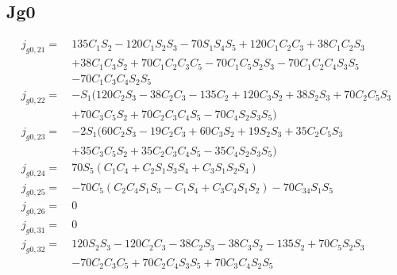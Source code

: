 \subsection{ \textbf{Jg0} }
\begin{equation*}
\begin{split}
j_{g0,21} =\  &135C_1S_2 - 120C_1S_2S_3 - 70S_1S_4S_5 + 120C_1C_2C_3 + 38C_1C_2S_3\\
			  & + 38C_1C_3S_2 + 70C_1C_2C_3C_5 - 70C_1C_5S_2S_3 - 70C_1C_2C_4S_3S_5\\
		 	  & - 70C_1C_3C_4S_2S_5\\
j_{g0,22} =\  &-S_1(120C_2S_3 - 38C_2C_3 - 135C_2 + 120C_3S_2 + 38S_2S_3 + 70C_2C_5S_3\\
		   	  &+ 70C_3C_5S_2 + 70C_2C_3C_4S_5 - 70C_4S_2S_3S_5)\\
j_{g0,23} =\  &-2S_1(60C_2S_3 - 19C_2C_3 + 60C_3S_2 + 19S_2S_3 + 35C_2C_5S_3\\
			  & + 35C_3C_5S_2 + 35C_2C_3C_4S_5 - 35C_4S_2S_3S_5)\\
j_{g0,24} =\  &70S_5(C_1C_4 + C_2S_1S_3S_4 + C_3S_1S_2S_4)\\
j_{g0,25} =\  &- 70C_5(C_2C_4S_1S_3 - C_1S_4 + C_3C_4S_1S_2) - 70C_{34}S_1S_5\\
j_{g0,26} =\  &0\\
j_{g0,31} =\  &0\\
j_{g0,32} =\  &120S_2S_3 - 120C_2C_3 - 38C_2S_3 - 38C_3S_2 - 135S_2 + 70C_5S_2S_3\\
			  & - 70C_2C_3C_5+ 70C_2C_4S_3S_5 + 70C_3C_4S_2S_5\\
\end{split}
\end{equation*}
